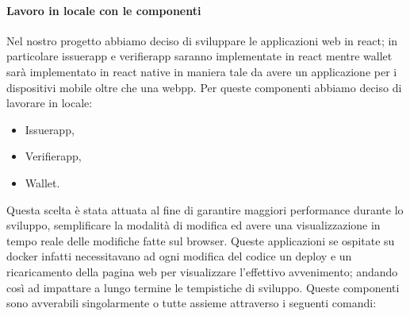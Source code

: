 \paragraph{Lavoro in locale con le componenti}
Nel nostro progetto abbiamo deciso di sviluppare le applicazioni web in react; in particolare issuerapp  e verifierapp saranno implementate in react mentre wallet sarà implementato in react native in maniera tale da avere un applicazione per i dispositivi mobile oltre che una webpp.
Per queste componenti abbiamo deciso di lavorare in locale:
\begin{itemize}
\item Issuerapp,
\item Verifierapp,
\item Wallet.
\end{itemize}
Questa scelta è stata attuata al fine di garantire maggiori performance durante lo sviluppo, semplificare la modalità di modifica ed avere una visualizzazione in tempo reale delle modifiche fatte sul browser. 
Queste applicazioni se ospitate su docker infatti necessitavano ad ogni modifica del codice un deploy e un ricaricamento della pagina web per visualizzare l’effettivo avvenimento; andando così ad impattare a lungo termine le tempistiche di sviluppo.
Queste componenti sono avverabili singolarmente o tutte assieme attraverso i seguenti comandi:
